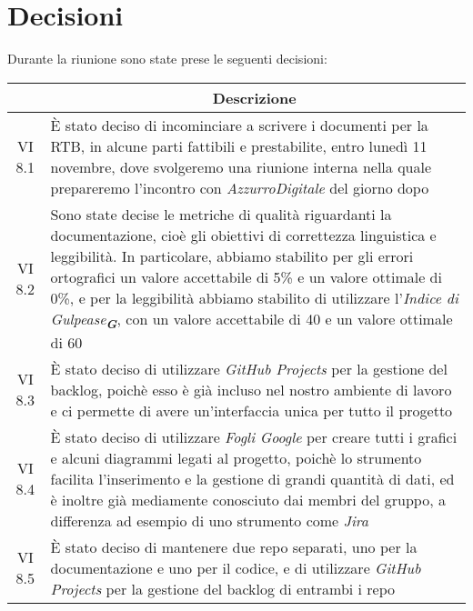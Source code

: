 

\section{Decisioni}

Durante la riunione sono state prese le seguenti decisioni:

\vspace{0.5cm}

\begin{table}[htbp]
    \centering
    \begin{tabular}{|c|p{}|}
        \hline
        \rowcolor[gray]{0.75}
        \multicolumn{1}{|c|}{\textbf{Codice}} & \multicolumn{1}{|c|}{\textbf{Descrizione}}\\
        \hline
        VI 8.1 & È stato deciso di incominciare a scrivere i documenti per la RTB, in alcune parti fattibili e prestabilite, entro lunedì 11 novembre,
        dove svolgeremo una riunione interna nella quale prepareremo l'incontro con \emph{AzzurroDigitale} del giorno dopo \\
        \hline
        VI 8.2 & Sono state decise le metriche di qualità riguardanti la documentazione, cioè gli obiettivi di correttezza linguistica e leggibilità.
        In particolare, abbiamo stabilito per gli errori ortografici un valore accettabile di 5\% e un valore ottimale di 0\%, e per la leggibilità abbiamo
        stabilito di utilizzare l'\emph{Indice di Gulpease}\textsubscript{\textit{\textbf{G}}}, con un valore accettabile di 40 e un valore ottimale di 60 \\
        \hline
        VI 8.3 & È stato deciso di utilizzare \emph{GitHub Projects} per la gestione del backlog, poichè esso è già incluso nel nostro ambiente di lavoro e ci
        permette di avere un'interfaccia unica per tutto il progetto \\
        \hline
        VI 8.4 & È stato deciso di utilizzare \emph{Fogli Google} per creare tutti i grafici e alcuni diagrammi legati al progetto, poichè lo strumento 
        facilita l'inserimento e la gestione di grandi quantità di dati, ed è inoltre già mediamente conosciuto dai membri del gruppo, a differenza ad 
        esempio di uno strumento come \emph{Jira} \\
        \hline
        VI 8.5 & È stato deciso di mantenere due repo separati, uno per la documentazione e uno per il codice, e di utilizzare \emph{GitHub Projects} per la
        gestione del backlog di entrambi i repo \\
        \hline
    \end{tabular}
    \end{table}
